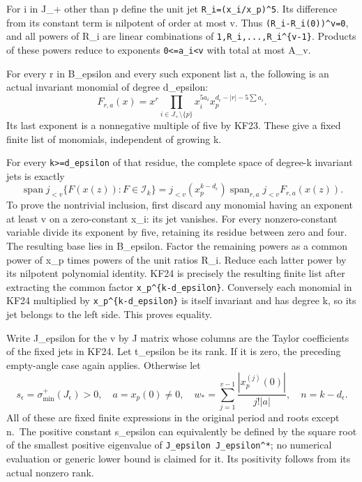 For i in J\_+ other than p define the unit jet \texttt{R\_i=(x\_i/x\_p)\^{}5}. Its difference from its constant term is nilpotent of order at most v. Thus \nolinkurl{(R_i-R_i(0))^v=0}, and all powers of R\_i are linear combinations of \nolinkurl{1,R_i,...,R_i^{v-1}}. Products of these powers reduce to exponents \texttt{0\textless{}=a\_i\textless{}v} with total at most A\_v.

For every r in B\_epsilon and every such exponent list a, the following is an actual invariant monomial of degree d\_epsilon: \[
F_{r,a}(x)=x^r\prod_{i\in J_+\setminus\{p\}}x_i^{5a_i}
 x_p^{d_\epsilon-|r|-5\sum a_i}.
\tag{KF24}
\] Its last exponent is a nonnegative multiple of five by KF23. These give a fixed finite list of monomials, independent of growing k.

For every \texttt{k\textgreater{}=d\_epsilon} of that residue, the complete space of degree-k invariant jets is exactly \[
\boxed{\operatorname{span}j_{<v}\{F(x(z)):F\in\mathscr I_k\}
=j_{<v}(x_p^{k-d_\epsilon})
 \operatorname{span}_{r,a}j_{<v}F_{r,a}(x(z)).}
\tag{KF25}
\] To prove the nontrivial inclusion, first discard any monomial having an exponent at least v on a zero-constant x\_i: its jet vanishes. For every nonzero-constant variable divide its exponent by five, retaining its residue between zero and four. The resulting base lies in B\_epsilon. Factor the remaining powers as a common power of x\_p times powers of the unit ratios R\_i. Reduce each latter power by its nilpotent polynomial identity. KF24 is precisely the resulting finite list after extracting the common factor \nolinkurl{x_p^{k-d_epsilon}}. Conversely each monomial in KF24 multiplied by \nolinkurl{x_p^{k-d_epsilon}} is itself invariant and has degree k, so its jet belongs to the left side. This proves equality.

Write J\_epsilon for the v by J matrix whose columns are the Taylor coefficients of the fixed jets in KF24. Let t\_epsilon be its rank. If it is zero, the preceding empty-angle case again applies. Otherwise let \[
s_\epsilon=\sigma_{\min}^+(J_\epsilon)>0,\quad
a=x_p(0)\ne0,\quad
w_* =\sum_{j=1}^{v-1}\frac{|x_p^{(j)}(0)|}{j!|a|},
\quad n=k-d_\epsilon.
\tag{KF26}
\] All of these are fixed finite expressions in the original period and roots except n.~The positive constant s\_epsilon can equivalently be defined by the square root of the smallest positive eigenvalue of \nolinkurl{J_epsilon J_epsilon^*}; no numerical evaluation or generic lower bound is claimed for it. Its positivity follows from its actual nonzero rank.

